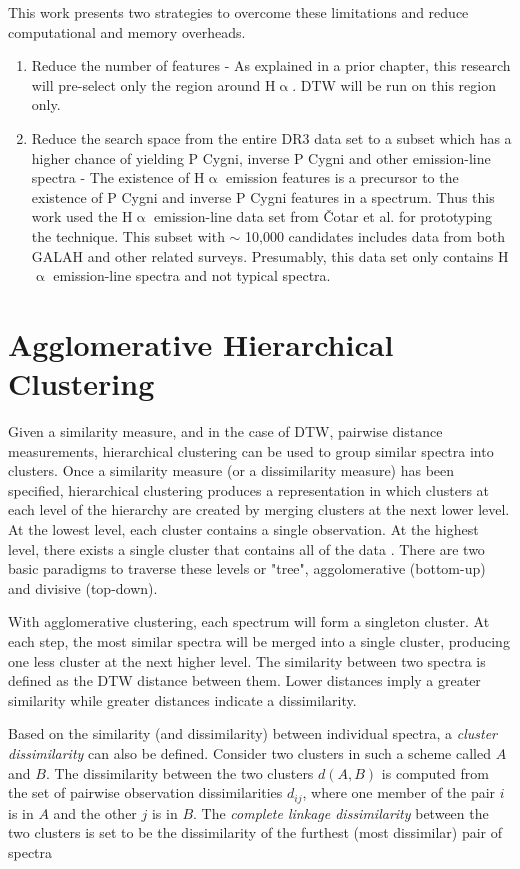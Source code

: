 This work presents two strategies to overcome these limitations and reduce computational and memory overheads.

\begin{enumerate}
    \item Reduce the number of features - As explained in a prior chapter, this research will pre-select only the region around H$\upalpha$. DTW will be run on this region only.
    \item Reduce the search space from the entire DR3 data set to a subset which has a higher chance of yielding P Cygni, inverse P Cygni and other emission-line spectra - The existence of H$\upalpha$ emission features is a precursor to the existence of P Cygni and inverse P Cygni features in a spectrum. Thus this work used the H$\upalpha$ emission-line data set from Čotar et al.\cite{vcotar2021galah} for prototyping the technique. This subset with $\sim$ 10,000 candidates includes data from both GALAH and other related surveys. Presumably, this data set only contains H$\upalpha$ emission-line spectra and not typical spectra.
\end{enumerate}

\section{Agglomerative Hierarchical Clustering}

Given a similarity measure, and in the case of DTW, pairwise distance measurements, hierarchical clustering can be used to group similar spectra into clusters. Once a similarity measure (or a dissimilarity measure) has been specified, hierarchical clustering produces a representation in which clusters at each level of the hierarchy are created by merging clusters at the next lower level. At the lowest level, each cluster contains a single observation. At the highest level, there exists a single cluster that contains all of the data \cite{hastie2009elements}. There are two basic paradigms to traverse these levels or "tree", aggolomerative (bottom-up) and divisive (top-down). 

With agglomerative clustering, each spectrum will form a singleton cluster. At each step, the most similar spectra will be merged into a single cluster, producing one less cluster at the next higher level. The similarity between two spectra is defined as the DTW distance between them. Lower distances imply a greater similarity while greater distances indicate a dissimilarity. 

Based on the similarity (and dissimilarity) between individual spectra, a \emph{cluster dissimilarity} can also be defined. Consider two clusters in such a scheme called $A$ and $B$. The dissimilarity between the two clusters $d(A,B)$ is computed from the set of pairwise observation dissimilarities $d_{ij}$, where one member of the pair $i$ is in $A$ and the other $j$ is in $B$. The \emph{complete linkage dissimilarity} between the two clusters is set to be the dissimilarity of the furthest (most dissimilar) pair of spectra

